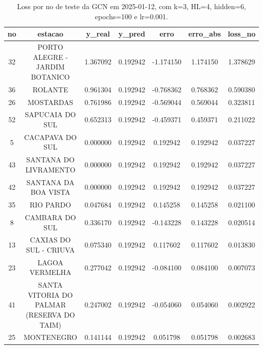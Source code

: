 \begin{table}[h]
\centering
\caption{Loss por no de teste da GCN em 2025-01-12, com k=3, HL=4, hidden=6, epochs=100 e lr=0.001.}
\label{tab:gcn_loss_k3_hl4_h6_e100_d20250112}
\begin{tabular}{ccccccc}
\toprule
no & estacao & y\_real & y\_pred & erro & erro\_abs & loss\_no \\
\midrule
32 & PORTO ALEGRE - JARDIM BOTANICO & 1.367092 & 0.192942 & -1.174150 & 1.174150 & 1.378629 \\
36 & ROLANTE & 0.961304 & 0.192942 & -0.768362 & 0.768362 & 0.590380 \\
26 & MOSTARDAS & 0.761986 & 0.192942 & -0.569044 & 0.569044 & 0.323811 \\
52 & SAPUCAIA DO SUL & 0.652313 & 0.192942 & -0.459371 & 0.459371 & 0.211022 \\
5 & CACAPAVA DO SUL & 0.000000 & 0.192942 & 0.192942 & 0.192942 & 0.037227 \\
43 & SANTANA DO LIVRAMENTO & 0.000000 & 0.192942 & 0.192942 & 0.192942 & 0.037227 \\
42 & SANTANA DA BOA VISTA & 0.000000 & 0.192942 & 0.192942 & 0.192942 & 0.037227 \\
35 & RIO PARDO & 0.047684 & 0.192942 & 0.145258 & 0.145258 & 0.021100 \\
8 & CAMBARA DO SUL & 0.336170 & 0.192942 & -0.143228 & 0.143228 & 0.020514 \\
13 & CAXIAS DO SUL - CRIUVA & 0.075340 & 0.192942 & 0.117602 & 0.117602 & 0.013830 \\
23 & LAGOA VERMELHA & 0.277042 & 0.192942 & -0.084100 & 0.084100 & 0.007073 \\
41 & SANTA VITORIA DO PALMAR (RESERVA DO TAIM) & 0.247002 & 0.192942 & -0.054060 & 0.054060 & 0.002922 \\
25 & MONTENEGRO & 0.141144 & 0.192942 & 0.051798 & 0.051798 & 0.002683 \\
\bottomrule
\end{tabular}
\end{table}
